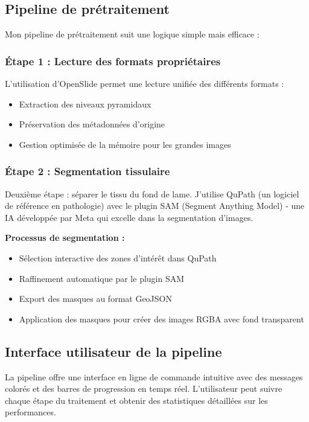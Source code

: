 \documentclass[11pt,a4paper]{report}
\begin{document}
\subsection{Pipeline de prétraitement}

Mon pipeline de prétraitement suit une logique simple mais efficace :

\subsubsection{Étape 1 : Lecture des formats propriétaires}

L'utilisation d'OpenSlide permet une lecture unifiée des différents formats :

\begin{itemize}
\item Extraction des niveaux pyramidaux
\item Préservation des métadonnées d'origine
\item Gestion optimisée de la mémoire pour les grandes images
\end{itemize}

\subsubsection{Étape 2 : Segmentation tissulaire}

Deuxième étape : séparer le tissu du fond de lame. J'utilise QuPath (un logiciel de référence en pathologie) avec le plugin SAM (Segment Anything Model) - une IA développée par Meta qui excelle dans la segmentation d'images.

\textbf{Processus de segmentation :}
\begin{itemize}
\item Sélection interactive des zones d'intérêt dans QuPath
\item Raffinement automatique par le plugin SAM
\item Export des masques au format GeoJSON
\item Application des masques pour créer des images RGBA avec fond transparent
\end{itemize}

\subsection{Interface utilisateur de la pipeline}

La pipeline offre une interface en ligne de commande intuitive avec des messages colorés et des barres de progression en temps réel. L'utilisateur peut suivre chaque étape du traitement et obtenir des statistiques détaillées sur les performances.
\end{document}
